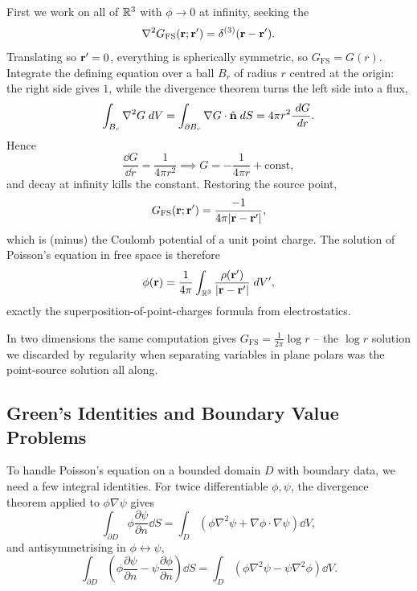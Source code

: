 \documentclass[a4paper]{scrartcl}
\begin{document}
First we work on all of $\mathbb{R}^3$ with $\phi \to 0$ at infinity, seeking the 
$$
\nabla^2 G_{\text{FS}}(\mathbf{r}; \mathbf{r}') = \delta^{(3)}(\mathbf{r} - \mathbf{r}').
$$
Translating so $\mathbf{r}' = 0$, everything is spherically symmetric, so $G_{\text{FS}} = G(r)$. Integrate the defining equation over a ball $B_r$ of radius $r$ centred at the origin: the right side gives $1$, while the divergence theorem turns the left side into a flux,
$$
\int_{B_r} \nabla^2 G \; d V = \int_{\partial B_r} \nabla G \cdot \hat{\mathbf{n}} \; d S = 4 \pi r^2 \frac{\; d G}{\; d r}.
$$
Hence
$$
\frac{\dd G}{\dd r} = \frac{1}{4 \pi r^2} \implies G = -\frac{1}{4 \pi r} + \text{const},
$$
and decay at infinity kills the constant. Restoring the source point,
$$
G_{\text{FS}}(\mathbf{r}; \mathbf{r}') = \frac{-1}{4 \pi \lvert\mathbf{r} - \mathbf{r}'\rvert},
$$
which is (minus) the Coulomb potential of a unit point charge. The solution of Poisson's equation in free space is therefore
$$
\phi(\mathbf{r}) = \frac{1}{4\pi} \int_{\mathbb{R}^3} \frac{\rho(\mathbf{r}')}{\lvert\mathbf{r} - \mathbf{r}'\rvert} \; d V',
$$
exactly the superposition-of-point-charges formula from electrostatics.

\begin{remark}
    In two dimensions the same computation gives $G_{\text{FS}} = \frac{1}{2\pi} \log r$ -- the $\log r$ solution we discarded by regularity when separating variables in plane polars was the point-source solution all along.
\end{remark}

\subsection{Green's Identities and Boundary Value Problems}

To handle Poisson's equation on a bounded domain $D$ with boundary data, we need a few integral identities. For twice differentiable $\phi, \psi$, the divergence theorem applied to $\phi \nabla \psi$ gives 
$$
\int_{\partial D} \phi \frac{\partial \psi}{\partial n} \dd S = \int_D \left(\phi \nabla^2 \psi + \nabla \phi \cdot \nabla \psi \right) \dd V,
$$
and antisymmetrising in $\phi \leftrightarrow \psi$, 
$$
\int_{\partial D} \left(\phi \frac{\partial \psi}{\partial n} - \psi \frac{\partial \phi}{\partial n}\right) \dd S = \int_D \left(\phi \nabla^2 \psi - \psi \nabla^2 \phi\right) \dd V.
$$
\end{document}
